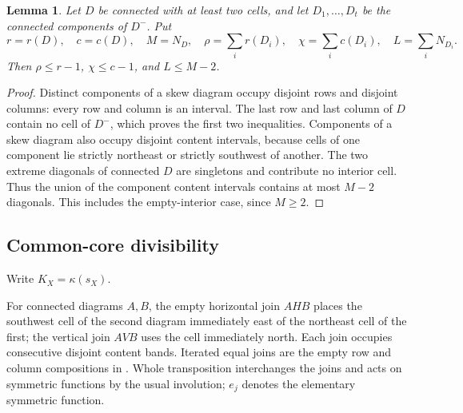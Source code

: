 \documentclass[11pt,a4paper]{amsart}
\numberwithin{equation}{section}
\theoremstyle{plain}
\newtheorem{lemma}[theorem]{Lemma}
\theoremstyle{definition}
\begin{document}
\begin{lemma}\label{lem:interior-bounds}
Let \(D\) be connected with at least two cells, and let \(D_1,\ldots,D_t\) be the connected components of \(D^-\).  Put
\begin{equation}\label{eq:outer-statistics}
 r=r(D),\quad c=c(D),\quad M=N_D,\quad
 \rho=\sum_i r(D_i),\quad \chi=\sum_i c(D_i),\quad L=\sum_i N_{D_i}.
\end{equation}
Then \(\rho\le r-1\), \(\chi\le c-1\), and \(L\le M-2\).
\end{lemma}
\begin{proof}
Distinct components of a skew diagram occupy disjoint rows and disjoint columns: every row and column is an interval.  The last row and last column of \(D\) contain no cell of \(D^-\), which proves the first two inequalities.  Components of a skew diagram also occupy disjoint content intervals, because cells of one component lie strictly northeast or strictly southwest of another.  The two extreme diagonals of connected \(D\) are singletons and contribute no interior cell.  Thus the union of the component content intervals contains at most \(M-2\) diagonals.  This includes the empty-interior case, since \(M\ge2\).
\end{proof}

\subsection{Common-core divisibility}\label{sec:corner-data}

Write \(K_X=\kappa(s_X)\).

For connected diagrams \(A,B\), the empty horizontal join \(AHB\) places the southwest cell of the second diagram immediately east of the northeast cell of the first; the vertical join \(AVB\) uses the cell immediately north.  Each join occupies consecutive disjoint content bands.  Iterated equal joins are the empty row and column compositions in .  Whole transposition interchanges the joins and acts on symmetric functions by the usual involution; \(e_j\) denotes the elementary symmetric function.
\end{document}
